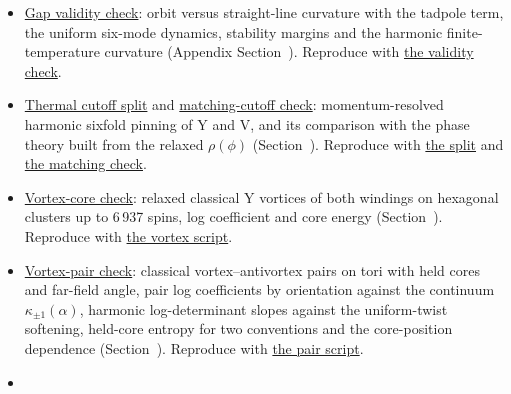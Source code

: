 \begin{itemize}
  mirror and the vacuum-energy identities \(v(\pi-\phi)=v(\phi)\) and
  \(v(\phi+2\pi/3)=v(\phi)\) on the Y and V orbits for mixed SOC, with
  the reflection about \(\phi=0\) as a control. Reproduce with
  \href{../../../examples/nbcp_c2t_reflection_check.py}{the reflection
  check}.
\item
  \href{../../../data-space/verification/261001-gap-validity/gap-validity-check.json}{Gap
  validity check}: orbit versus straight-line curvature with the
  tadpole term, the uniform six-mode dynamics, stability margins and the
  harmonic finite-temperature curvature (Appendix
  Section~). Reproduce with
  \href{../../../examples/nbcp_gap_validity_check.py}{the validity
  check}.
\item
  \href{../../../data-space/verification/261001-angular-thermal-split/angular-thermal-split.json}{Thermal
  cutoff split} and
  \href{../../../data-space/verification/261002-matching-cutoff/matching-cutoff-check.json}{matching-cutoff
  check}: momentum-resolved harmonic sixfold pinning of Y and V, and its
  comparison with the phase theory built from the relaxed
  \(\rho(\phi)\) (Section~). Reproduce
  with \href{../../../examples/nbcp_angular_thermal_split.py}{the split}
  and \href{../../../examples/nbcp_matching_cutoff_check.py}{the
  matching check}.
\item
  \href{../../../data-space/verification/261002-y-vortex-core/vortex-core-check.json}{Vortex-core
  check}: relaxed classical Y vortices of both windings on hexagonal
  clusters up to 6\,937 spins, log coefficient and core energy
  (Section~). Reproduce with
  \href{../../../examples/nbcp_y_vortex_core.py}{the vortex script}.
\item
  \href{../../../data-space/verification/261002-y-vortex-pair/vortex-pair-check.json}{Vortex-pair
  check}: classical vortex--antivortex pairs on tori with held cores and
  far-field angle, pair log coefficients by orientation against the
  continuum \(\kappa_{\pm1}(\alpha)\), harmonic log-determinant
  slopes against the uniform-twist softening, held-core entropy for two
  conventions and the core-position dependence
  (Section~). Reproduce with
  \href{../../../examples/nbcp_y_vortex_pair.py}{the pair script}.
\item

\end{itemize}

